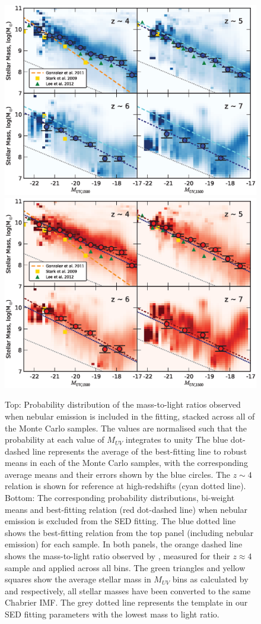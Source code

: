 \begin{figure}
\includegraphics[width=130mm]{plots/fig8a.eps}
\includegraphics[width=130mm]{plots/fig8b.eps}
\caption{Top: Probability distribution of the mass-to-light ratios observed when nebular emission is included in the fitting, stacked across all of the Monte Carlo samples. The values are normalised such that the probability at each value of $M_{UV}$ integrates to unity The blue dot-dashed line represents the average of the best-fitting line to robust means in each of the Monte Carlo samples, with the corresponding average means and their errors shown by the blue circles. The $z \sim 4$ relation is shown for reference at high-redshifts (cyan dotted line). Bottom: The corresponding probability distributions, bi-weight means and best-fitting relation (red dot-dashed line) when nebular emission is excluded from the SED fitting.  The blue dotted line shows the best-fitting relation from the top panel (including nebular emission) for each sample. In both panels, the orange dashed line shows the mass-to-light ratio observed by \citet{Gonzalez:2011dn}, measured for their $z \approx 4$ sample and applied across all bins. The green triangles and yellow squares show the average stellar mass in $M_{UV}$ bins as calculated by \citet{2012ApJ...752...66L} and \citet{2009ApJ...697.1493S} respectively, all stellar masses have been converted to the same Chabrier IMF. The grey dotted line represents the template in our SED fitting parameters with the lowest mass to light ratio.}

\end{figure}
